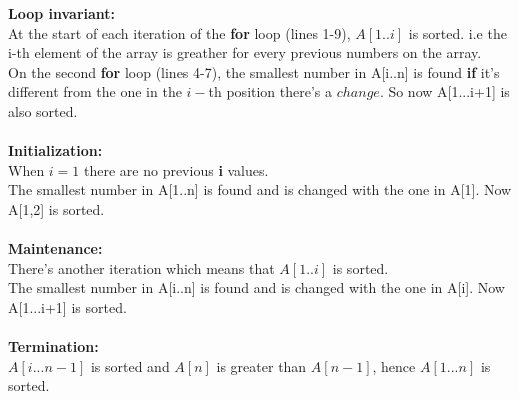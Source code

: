 \documentclass[12pt, twoside, a4paper]{article}
\begin{document}
  \textbf{Loop invariant:}\\ At the start of each iteration of the \textbf{for} loop (lines 1-9), $A[1..i]$ is sorted. i.e the i-th element of the array is
  greather for every previous numbers on the array.\\
  On the second \textbf{for} loop (lines 4-7), the smallest number in A[i..n] is found \textbf{if} it's different from the one in the $i-$th position there's
  a $change$. So now A[1...i+1] is also sorted.\\ \\
  \textbf{Initialization:} \\ 
  When $i = 1$ there are no previous \textbf{i} values.\\
  The smallest number in A[1..n] is found and is changed with the one in
   A[1]. Now A[1,2] is sorted. \\ \\
  \textbf{Maintenance:} \\
  There's another iteration which means that $A[1..i]$ is sorted. \\
  The smallest number in A[i..n] is found and is changed with the one in
  A[i]. Now A[1...i+1] is sorted. \\ \\
  \textbf{Termination:}\\
  $A[i...n-1]$ is sorted and $A[n]$ is greater than $A[n-1]$,
  hence $A[1...n]$ is sorted.\\
\end{document}
